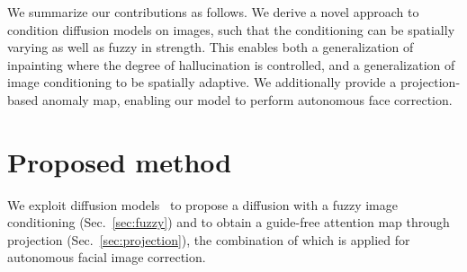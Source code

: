 \documentclass{article}
\begin{document}
We summarize our contributions as follows. We derive a novel approach to condition diffusion models on images, such that the conditioning can be spatially varying as well as fuzzy in strength. This enables both a generalization of inpainting where the degree of hallucination is controlled, and a generalization of image conditioning to be spatially adaptive. We additionally provide a projection-based anomaly map, enabling our model to perform autonomous face correction. 



\section{Proposed method}
We exploit diffusion models~\cite{sohl2015deep} to propose a diffusion with a fuzzy image conditioning (Sec.~\ref{sec:fuzzy}) and to obtain a guide-free attention map through projection (Sec.~\ref{sec:projection}), the combination of which is applied for autonomous facial image correction.
\end{document}
